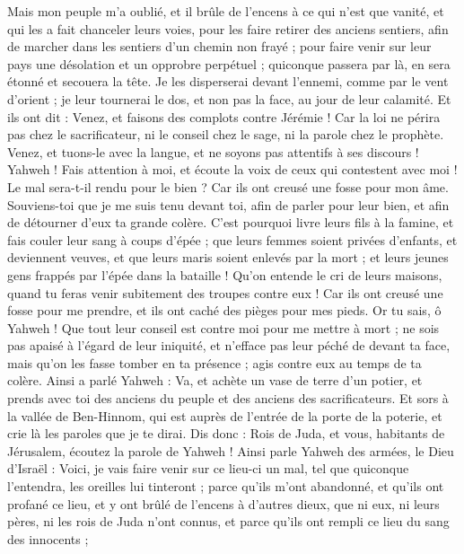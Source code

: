 \begin{multicols}{2}
Mais mon peuple m'a oublié, et il brûle de l'encens à ce qui n'est que vanité, et qui les a fait chanceler leurs voies, pour les faire retirer des anciens sentiers, afin de marcher dans les sentiers d'un chemin non frayé ;
pour faire venir sur leur pays une désolation et un opprobre perpétuel ; quiconque passera par là, en sera étonné et secouera la tête.
Je les disperserai devant l'ennemi, comme par le vent d'orient ; je leur tournerai le dos, et non pas la face, au jour de leur calamité.
Et ils ont dit : Venez, et faisons des complots contre Jérémie ! Car la loi ne périra pas chez le sacrificateur, ni le conseil chez le sage, ni la parole chez le prophète. Venez, et tuons-le avec la langue, et ne soyons pas attentifs à ses discours !
Yahweh ! Fais attention à moi, et écoute la voix de ceux qui contestent avec moi !
Le mal sera-t-il rendu pour le bien ? Car ils ont creusé une fosse pour mon âme. Souviens-toi que je me suis tenu devant toi, afin de parler pour leur bien, et afin de détourner d'eux ta grande colère.
C'est pourquoi livre leurs fils à la famine, et fais couler leur sang à coups d’épée ; que leurs femmes soient privées d'enfants, et deviennent veuves, et que leurs maris soient enlevés par la mort ; et leurs jeunes gens frappés par l'épée dans la bataille !
Qu'on entende le cri de leurs maisons, quand tu feras venir subitement des troupes contre eux ! Car ils ont creusé une fosse pour me prendre, et ils ont caché des pièges pour mes pieds.
Or tu sais, ô Yahweh ! Que tout leur conseil est contre moi pour me mettre à mort ; ne sois pas apaisé à l'égard de leur iniquité, et n'efface pas leur péché de devant ta face, mais qu'on les fasse tomber en ta présence ; agis contre eux au temps de ta colère.
\VerseOne{}Ainsi a parlé Yahweh : Va, et achète un vase de terre d'un potier, et prends avec toi des anciens du peuple et des anciens des sacrificateurs.
Et sors à la vallée de Ben-Hinnom, qui est auprès de l'entrée de la porte de la poterie, et crie là les paroles que je te dirai.
Dis donc : Rois de Juda, et vous, habitants de Jérusalem, écoutez la parole de Yahweh ! Ainsi parle Yahweh des armées, le Dieu d'Israël : Voici, je vais faire venir sur ce lieu-ci un mal, tel que quiconque l'entendra, les oreilles lui tinteront ; 
parce qu'ils m'ont abandonné, et qu'ils ont profané ce lieu, et y ont brûlé de l'encens à d'autres dieux, que ni eux, ni leurs pères, ni les rois de Juda n'ont connus, et parce qu'ils ont rempli ce lieu du sang des innocents ;

\end{multicols}

